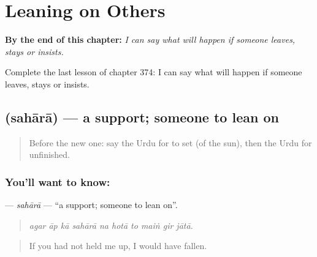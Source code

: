 
\chapter{Leaning on Others}
\label{ch:ur-leaning-on-others}

\begin{chapteropening}
\textbf{By the end of this chapter:} \emph{I can say what will happen if someone leaves, stays or insists.}

Complete the last lesson of chapter 374: I can say what will happen if someone leaves, stays or insists.
\end{chapteropening}

\section[\texorpdfstring{\ur{سہارا} (sahārā)}{سہارا (sahārā)}]{ (sahārā) — a support; someone to lean on}

\label{lesson:UR-C374-sahara}



\begin{quote}
Before the new one: say the Urdu for to set (of the sun), then the Urdu for unfinished.
\end{quote}

\subsection*{You'll want to know: }
\textbf{} — \emph{sahārā} — \textquotedblleft{}a support; someone to lean on\textquotedblright{}.

\begin{quote}
         
\end{quote}

\begin{quote}
\emph{agar āp kā sahārā na hotā to maiṅ gir jātā.}
\end{quote}

\begin{quote}
If you had not held me up, I would have fallen.
\end{quote}

